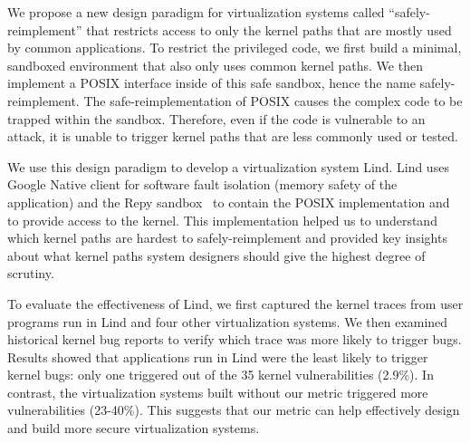 We propose a new design paradigm for virtualization 
systems called ``safely-reimplement'' that restricts access to only the
kernel paths that are mostly used by common applications.  To restrict the privileged
code, we first build a minimal, sandboxed environment that also only uses 
common kernel paths.
We then implement a POSIX interface inside of this safe sandbox, hence the
name safely-reimplement. The safe-reimplementation of POSIX causes the
complex code to be trapped within the sandbox.  Therefore, even if the code
is vulnerable to an attack, it is unable to trigger
kernel paths that are less commonly used or tested.

We use this design paradigm to develop a virtualization system
Lind.  Lind uses Google Native client for software fault isolation (memory
safety of the application) and the Repy sandbox~\cite{Repy-10} to contain the POSIX
implementation and to provide access to the kernel.  This implementation
helped us to understand which kernel paths are hardest to
safely-reimplement and provided key insights about what kernel paths system
designers should give the highest degree of scrutiny. 

To evaluate the effectiveness of Lind, we first captured the 
kernel traces from user programs run in Lind and four other virtualization
systems.
We then examined historical
kernel bug reports to verify which trace was more likely to trigger bugs.
Results showed that applications run in Lind were the least likely to
trigger kernel bugs: only one triggered out of the 35 kernel vulnerabilities 
(2.9\%). In contrast, the virtualization systems built
without our metric triggered more vulnerabilities (23-40\%). This
suggests that our metric can help effectively design and build more secure
virtualization systems.

